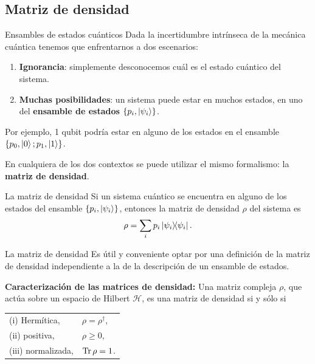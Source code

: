\documentclass[11pt]{beamer}
\newcommand{\p}{\ket{\psi_i}}
\newcommand{\R}{\rho}
\begin{document}
\subsection{Matriz de densidad}
\begin{frame}{Ensambles de estados cuánticos}
Dada la incertidumbre intrínseca de la mecánica cuántica tenemos que 
enfrentarnos a dos escenarios: 
\begin{enumerate}
	\item \textbf{Ignorancia}: simplemente desconocemos cuál es el estado cuántico del 
				sistema.
	\item \textbf{Muchas posibilidades}: un sistema puede estar en muchos estados, en uno
				del \textbf{ensamble de estados} $\{ p_i, \p \}$.
\end{enumerate} \vfill

Por ejemplo, 1 qubit podría estar en alguno de los estados en el ensamble
$\{ p_0,\ket{0}; p_1, \ket{1} \}$.\vfill

En cualquiera de los dos contextos se puede utilizar el mismo formalismo:
la \textbf{matriz de densidad}. 
\end{frame}



\begin{frame}{La matriz de densidad}
Si un sistema cuántico se encuentra en alguno de los estados del ensamble
$\{ p_i, \ket{\psi _i} \}$, entonces la matriz de densidad
$\rho$ del sistema es
\begin{equation}
	\rho = \sum _i p_i\dyad{\psi_i}{\psi_i}.
\end{equation}
\end{frame}


\begin{frame}{La matriz de densidad}
Es útil y conveniente optar por una definición de la matriz de densidad
independiente a la de la descripción de un ensamble de estados. \vfill

\textbf{Caracterización de las matrices de densidad:}
Una matriz compleja $\R$, que actúa sobre un espacio de Hilbert
$\mathcal{H}$, es una matriz de densidad si y sólo si 

\begin{center}
\begin{tabular}{ll}
(i) Hermítica, & $\rho = \rho ^{\dagger}$, \\ 
(ii) positiva, & $\rho \geq 0$, \\ 
(iii) normalizada, & $\Tr \rho = 1$. \\ 

\end{tabular} 
\end{center}
\vfill
\end{frame}
\end{document}
